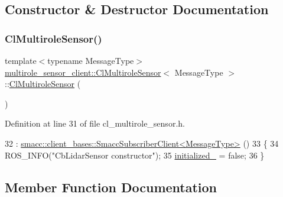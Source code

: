 \subsection{Constructor \& Destructor Documentation}
\mbox{\label{classmultirole__sensor__client_1_1ClMultiroleSensor_a1d122d732da85dd3841096f294a8161e}} 
\subsubsection{\texorpdfstring{Cl\+Multirole\+Sensor()}{ClMultiroleSensor()}}
{\footnotesize\ttfamily template$<$typename Message\+Type$>$ \\
\hyperlink{classmultirole__sensor__client_1_1ClMultiroleSensor}{multirole\+\_\+sensor\+\_\+client\+::\+Cl\+Multirole\+Sensor}$<$ Message\+Type $>$\+::\hyperlink{classmultirole__sensor__client_1_1ClMultiroleSensor}{Cl\+Multirole\+Sensor} (\begin{DoxyParamCaption}{ }\end{DoxyParamCaption})\hspace{0.3cm}{\ttfamily [inline]}}



Definition at line 31 of file cl\+\_\+multirole\+\_\+sensor.\+h.


\begin{DoxyCode}
32       : \hyperlink{classsmacc_1_1client__bases_1_1SmaccSubscriberClient}{smacc::client\_bases::SmaccSubscriberClient<MessageType>}
      ()
33   \{
34     ROS\_INFO(\textcolor{stringliteral}{"CbLidarSensor constructor"});
35     \hyperlink{classmultirole__sensor__client_1_1ClMultiroleSensor_a6e7db1927a389af715f541837ac78d99}{initialized\_} = \textcolor{keyword}{false};
36   \}
\end{DoxyCode}


\subsection{Member Function Documentation}
\mbox{\label{classmultirole__sensor__client_1_1ClMultiroleSensor_a243e8ec849d380d5934a384521423c9a}} 

